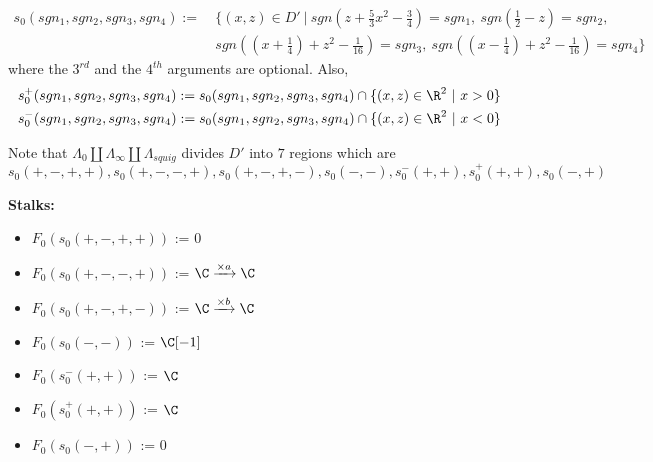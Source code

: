 \begin{definition}
\begin{align*}
s_0(sgn_1,sgn_2,sgn_3,sgn_4):=~ &\{(x,z) \in D' ~|~ sgn(z+\frac{5}{3}x^2 - \frac{3}{4})=sgn_1,~ sgn(\frac{1}{2}-z)=sgn_2,\\ 
&sgn((x+\frac{1}{4})+z^2 - \frac{1}{16})=sgn_3,~sgn((x-\frac{1}{4})+z^2 - \frac{1}{16})=sgn_4 \}
\end{align*}
where the $3^{rd}$ and the $4^{th}$ arguments are optional. Also, \begin{align*}
&s_0^+(sgn_1,sgn_2,sgn_3,sgn_4) := s_0(sgn_1,sgn_2,sgn_3,sgn_4) \cap \{(x,z)\in \R^2 ~|~ x>0\} \\
&s_0^-(sgn_1,sgn_2,sgn_3,sgn_4) := s_0(sgn_1,sgn_2,sgn_3,sgn_4) \cap \{(x,z)\in \R^2 ~|~ x<0\} \\
\end{align*}
\end{definition}

Note that $\Lambda_0 \coprod \Lambda_\infty \coprod \Lambda_{squig}$ divides $D'$ into $7$ regions which are
\[
	s_0(+,-,+,+),s_0(+,-,-,+),s_0(+,-,+,-),s_0(-,-),s_0^-(+,+),s_0^+(+,+),s_0(-,+)
\]

\textbf{Stalks:}
\begin{itemize}
\item $F_0(s_0(+,-,+,+))$ := $0$
\item $F_0(s_0(+,-,-,+))$ := $\C \xrightarrow{\times a} \C $
\item $F_0(s_0(+,-,+,-))$ := $\C \xrightarrow{\times b} \C $
\item $F_0(s_0(-,-))$ := $\C[-1]$
\item $F_0(s_0^-(+,+))$ := $\C$
\item $F_0(s_0^+(+,+))$ := $\C$
\item $F_0(s_0(-,+))$ := $0$
\end{itemize}

